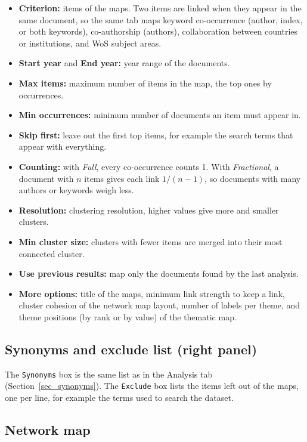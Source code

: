 \documentclass[10pt,letterpaper]{article}
\begin{document}
\begin{itemize}
\item \textbf{Criterion:} items of the maps. Two items are linked when they appear in the same document, so the same tab maps keyword co-occurrence (author, index, or both keywords), co-authorship (authors), collaboration between countries or institutions, and WoS subject areas.
\item \textbf{Start year} and \textbf{End year:} year range of the documents.
\item \textbf{Max items:} maximum number of items in the map, the top ones by occurrences.
\item \textbf{Min occurrences:} minimum number of documents an item must appear in.
\item \textbf{Skip first:} leave out the first top items, for example the search terms that appear with everything.
\item \textbf{Counting:} with \emph{Full}, every co-occurrence counts 1. With \emph{Fractional}, a document with $n$ items gives each link $1/(n-1)$, so documents with many authors or keywords weigh less.
\item \textbf{Resolution:} clustering resolution, higher values give more and smaller clusters.
\item \textbf{Min cluster size:} clusters with fewer items are merged into their most connected cluster.
\item \textbf{Use previous results:} map only the documents found by the last analysis.
\item \textbf{More options:} title of the maps, minimum link strength to keep a link, cluster cohesion of the network map layout, number of labels per theme, and theme positions (by rank or by value) of the thematic map.
\end{itemize}

\subsection{Synonyms and exclude list (right panel)}

The \verb|Synonyms| box is the same list as in the Analysis tab (Section~\ref{sec_synonyms}). The \verb|Exclude| box lists the items left out of the maps, one per line, for example the terms used to search the dataset.

\subsection{Network map}
\end{document}
